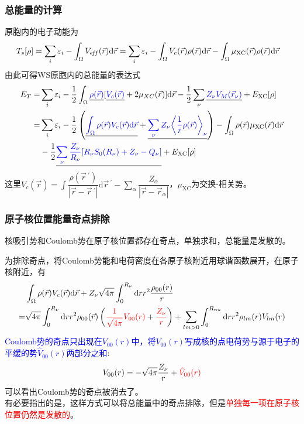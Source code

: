 \documentclass[cjk,slidestop,compress,mathserif,blue]{beamer}
\begin{document}
\frame
{
\frametitle{总能量的计算}
原胞内的电子动能为
\begin{displaymath}
	\hspace*{-10pt}
	T_s[\rho]=\sum_i\varepsilon_i-\int_{\Omega}V_{e\!f\!f}(\vec r)\mathrm{d}\vec r=\sum_i\varepsilon_i-\int_{\Omega}V_c(\vec r)\rho(\vec r)\mathrm{d}\vec r-\int_{\Omega}\mu_{\mathrm{XC}}(\vec r)\rho(\vec r)\mathrm{d}\vec r
\end{displaymath}
由此可得\textrm{WS}原胞内的总能量的表达式
{\fontsize{9.5pt}{5.2pt}\selectfont
\begin{displaymath}
\begin{split}
	E_T=&\sum_i\varepsilon_i-\frac12\int_{\Omega}\underline{\textcolor{blue}{\rho(\vec r)}}[\underline{\textcolor{blue}{V_c(\vec r)}}+2\mu_{XC}(\vec r)]\mathrm{d}\vec r-\frac12\sum_{\nu}\underline{\textcolor{blue}{Z_{\nu}V_M(\vec r_{\nu})}}+E_{\mathrm{XC}}[\rho] \\
	=&\sum_i\varepsilon_i-\frac12\left(\underline{\textcolor{blue}{\int_{\Omega}\rho(\vec r)V_c(\vec r)\mathrm{d}\vec r}}+\underline{\textcolor{blue}{\sum_{\nu}Z_{\nu}\bigg\langle\frac1r\rho(\vec r)\bigg\rangle_{\nu}}}\right)-%
   \int_{\Omega}\rho(\vec r)\mu_{\mathrm{XC}}(\vec r)\mathrm{d}\vec r \\
   &-\frac12\underline{\textcolor{blue}{\sum_{\nu}\frac{Z_{\nu}}{R_{\nu}}[R_{\nu}S_0(R_{\nu})+Z_{\nu}-Q_{\nu}]}}+E_{\mathrm{XC}}[\rho]
\end{split}
\end{displaymath}
}
这里$V_c(\vec r)\!=\!\displaystyle\int\dfrac{\rho(\vec r\,^\prime)}{|\vec r-{\vec r}\,^\prime|}\mathrm{d}\vec r\,^\prime-\sum\limits_{\alpha}\dfrac{Z_{\alpha}}{|\vec r-\vec r_{\alpha}|}$，$\mu_{\mathrm{XC}}$为交换-相关势。
}

\frame
{
\frametitle{原子核位置能量奇点排除}
核吸引势和\textrm{Coulomb}势在原子核位置都存在奇点，单独求和，总能量是发散的。

为排除奇点，将\textrm{Coulomb}势能和电荷密度在各原子核附近用球谐函数展开，在原子核附近，有
{\fontsize{9.0pt}{5.2pt}\selectfont
\begin{displaymath}
  \begin{split}
    &\int_{\Omega}\rho(\vec r)V_c(\vec r)\mathrm{d}\vec r+Z_{\nu}\sqrt{4\pi}\int_0^{R_{\nu}}\mathrm{d}rr^2\frac{\rho_{00}(r)}r\\
    =&\sqrt{4\pi}\int_0^{R_{\nu}}\mathrm{d}rr^2\rho_{00}(\vec r)\left(\textcolor{red}{\dfrac1{\sqrt{4\pi}}V_{00}(r)}+\textcolor{red}{\frac{Z_{\nu}}r}\right)+\sum_{lm>0}\int_0^{R_{nu}}\mathrm{d}rr^2\rho_{lm}(r)V_{lm}(r)
  \end{split}
\end{displaymath}
}
\textcolor{blue}{\textrm{Coulomb}势的奇点只出现在$V_{00}(r)$中，将$V_{00}(r)$写成核的点电荷势与源于电子的平缓的势$\hat V_{00}(r)$两部分之和}:~
\textcolor{red}{$$V_{00}(r)=-\sqrt{4\pi}\frac{Z_{\nu}}r+\textcolor{red}{\hat V_{00}(r)}$$}
可以看出\textrm{Coulomb}势的奇点被消去了。\\有必要指出的是，这样方式可以将总能量中的奇点排除，但是\textcolor{red}{单独每一项在原子核位置仍然是发散的}。
}
\end{document}
